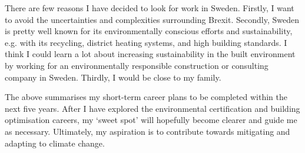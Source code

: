 There are few reasons I have decided to look for work in Sweden.
Firstly, I want to avoid the uncertainties and complexities surrounding Brexit.
Secondly, Sweden is pretty well known for its environmentally conscious efforts and sustainability, e.g. with its recycling, district heating systems, and high building standards.
I think I could learn a lot about increasing sustainability in the built environment by working for an environmentally responsible construction or consulting company in Sweden.
Thirdly, I would be close to my family.

The above summarises my short-term career plans to be completed within the next five years.
After I have explored the environmental certification and building optimisation careers, my `sweet spot' will hopefully become clearer and guide me as necessary.
Ultimately, my aspiration is to contribute towards mitigating and adapting to climate change.





